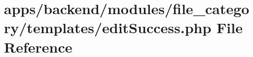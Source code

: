 \hypertarget{backend_2modules_2file__category_2templates_2edit_success_8php}{\section{apps/backend/modules/file\-\_\-category/templates/edit\-Success.php File Reference}
\label{backend_2modules_2file__category_2templates_2edit_success_8php}
}
